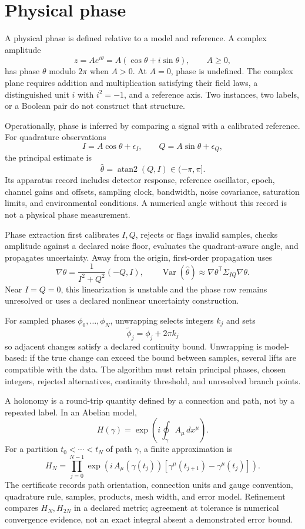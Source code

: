 \section{Physical phase}

A physical phase is defined relative to a model and reference.  A complex amplitude
\[
                         z=Ae^{i\theta}=A(\cos\theta+i\sin\theta),
\qquad A\geq0,
\]
has phase \(\theta\) modulo \(2\pi\) when \(A>0\).  At \(A=0\), phase is undefined.  The complex plane requires
addition and multiplication satisfying their field laws, a distinguished unit \(i\) with \(i^2=-1\), and a reference
axis.  Two instances, two labels, or a Boolean pair do not construct that structure.

Operationally, phase is inferred by comparing a signal with a calibrated reference.  For quadrature observations
\[
                         I=A\cos\theta+\epsilon_I,\qquad
                         Q=A\sin\theta+\epsilon_Q,
\]
the principal estimate is
\[
                         \widehat\theta=\operatorname{atan2}(Q,I)\in(-\pi,\pi].
\]
Its apparatus record includes detector response, reference oscillator, epoch, channel gains and offsets, sampling
clock, bandwidth, noise covariance, saturation limits, and environmental conditions.  A numerical angle without this
record is not a physical phase measurement.

Phase extraction first calibrates \(I,Q\), rejects or flags invalid samples, checks amplitude against a declared
noise floor, evaluates the quadrant-aware angle, and propagates uncertainty.  Away from the origin, first-order
propagation uses
\[
\nabla\theta=\frac{1}{I^2+Q^2}(-Q,I),\qquad
\operatorname{Var}(\widehat\theta)\approx
\nabla\theta^{\mathsf T}\Sigma_{IQ}\nabla\theta.
\]
Near \(I=Q=0\), this linearization is unstable and the phase row remains unresolved or uses a declared nonlinear
uncertainty construction.

For sampled phases \(\phi_0,\ldots,\phi_N\), unwrapping selects integers \(k_j\) and sets
\[
                         \widetilde\phi_j=\phi_j+2\pi k_j
\]
so adjacent changes satisfy a declared continuity bound.  Unwrapping is model-based: if the true change can exceed
the bound between samples, several lifts are compatible with the data.  The algorithm must retain principal phases,
chosen integers, rejected alternatives, continuity threshold, and unresolved branch points.

A holonomy is a round-trip quantity defined by a connection and path, not by a repeated label.  In an Abelian model,
\[
                         H(\gamma)=\exp\!\left(i\oint_\gamma A_\mu\,dx^\mu\right).
\]
For a partition \(t_0<\cdots<t_N\) of path \(\gamma\), a finite approximation is
\[
H_N=\prod_{j=0}^{N-1}
\exp\!\left(i\,A_\mu(\gamma(t_j))[\gamma^\mu(t_{j+1})-\gamma^\mu(t_j)]\right).
\]
The certificate records path orientation, connection units and gauge convention, quadrature rule, samples, products,
mesh width, and error model.  Refinement compares \(H_N,H_{2N}\) in a declared metric; agreement at tolerance is
numerical convergence evidence, not an exact integral absent a demonstrated error bound.

